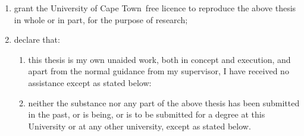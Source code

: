 \documentclass[a4paper, 11pt, oneside, openright, parskip=full]{book}
\newcommand{\uni}{University of Cape Town}				%
\begin{document}
\begin{enumerate}
	\item		grant the \uni\  free licence to reproduce the above thesis in whole or in part, for the purpose of research;
	\item		declare that:
	
	\begin{enumerate}
		\item		this thesis is my own unaided work, both in concept and execution, and apart from the normal guidance from my supervisor, I have received no assistance except as stated below:
		\item		neither the substance nor any part of the above thesis has been submitted in the past, or is being, or is to be submitted for a degree at this University or at any other university, except as stated below.
	\end{enumerate}	
\end{enumerate}
\end{document}
